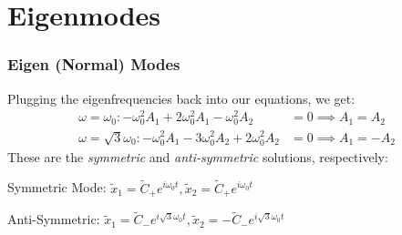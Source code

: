 \documentclass[pdf,handout, hideothersubsections]{beamer}
\begin{document}
\section{Eigenmodes}
\begin{frame}
\frametitle{Eigen (Normal) Modes}
\pause
Plugging the eigenfrequencies back into our equations, we get:
\pause
\begin{align}
\omega = \omega_0 :  -\omega_0^2 A_1 + 2 \omega_0^2 A_1 - \omega_0^2 A_2 &=
0 \implies A_1 = A_2\\
\omega = \sqrt{3} \omega_0 :  -\omega_0^2 A_1 - 3 \omega_0^2 A_2 + 2 \omega_0^2 A_2 &=
0 \implies A_1 = - A_2
\end{align}
\pause
These are the \emph{symmetric} and \emph{anti-symmetric} solutions,
respectively:

\begin{block}{Symmetric Mode:}
$ \tilde{x}_1 = \tilde{C}_+ e^{i \omega_0 t}, \tilde{x}_2 = \tilde{C}_+
e^{i \omega_0 t}$
\end{block}
\begin{alertblock}{Anti-Symmetric:}
$\tilde{x}_1 = \tilde{C}_- e^{i \sqrt{3} \omega_0 t},
\tilde{x}_2 = -\tilde{C}_- e^{i \sqrt{3} \omega_0 t}$
\end{alertblock}

\end{frame}
\end{document}
